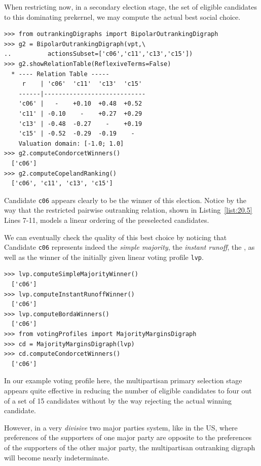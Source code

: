 
When restricting now, in a secondary election stage, the set of eligible candidates to this dominating prekernel, we may compute the actual best social choice.
\begin{lstlisting}[caption={Recommending the secondary election winner},label=list:20.5]
>>> from outrankingDigraphs import BipolarOutrankingDigraph
>>> g2 = BipolarOutrankingDigraph(vpt,\
..          actionsSubset=['c06','c11','c13','c15'])
>>> g2.showRelationTable(ReflexiveTerms=False)
  * ---- Relation Table -----
     r    | 'c06'  'c11'  'c13'  'c15'   
    ------|----------------------------
    'c06' |   -    +0.10  +0.48  +0.52  
    'c11' | -0.10    -    +0.27  +0.29  
    'c13' | -0.48  -0.27    -    +0.19  
    'c15' | -0.52  -0.29  -0.19    -   
    Valuation domain: [-1.0; 1.0]
>>> g2.computeCondorcetWinners()
  ['c06']
>>> g2.computeCopelandRanking()
  ['c06', 'c11', 'c13', 'c15']
\end{lstlisting}

Candidate \texttt{c06} appears clearly to be the winner of this election. Notice by the way that the restricted pairwise outranking relation, shown in Listing~\ref{list:20.5} Lines 7-11, models a linear ordering of the preselected candidates.

We can eventually check the quality of this best choice by noticing that Candidate \texttt{c06} represents indeed the \emph{simple majority}, the \emph{instant runoff}, the \Borda, as well as the \Condorcet winner of the initially given linear voting profile \texttt{lvp}.
\begin{lstlisting}
>>> lvp.computeSimpleMajorityWinner()
  ['c06']
>>> lvp.computeInstantRunoffWinner()
  ['c06']
>>> lvp.computeBordaWinners()
  ['c06']
>>> from votingProfiles import MajorityMarginsDigraph
>>> cd = MajorityMarginsDigraph(lvp)
>>> cd.computeCondorcetWinners()
  ['c06']
\end{lstlisting}

In our example voting profile here, the multipartisan primary selection stage appears quite effective in reducing the number of eligible candidates to four out of a set of 15 candidates without by the way rejecting the actual winning candidate.

However, in a very \emph{divisive} two major parties system, like in the US, where preferences of the supporters of one major party are opposite to the preferences of the supporters of the other major party, the multipartisan outranking digraph will become nearly indeterminate.

